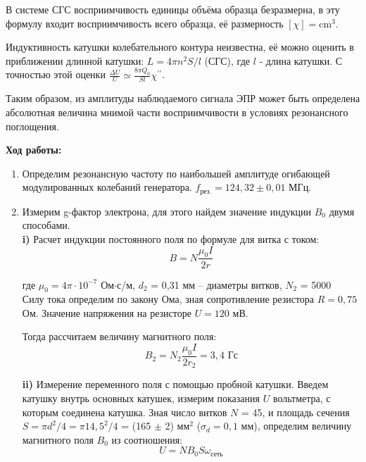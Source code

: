 \documentclass[a4paper, 12pt]{article}%
\begin{document}
	В системе СГС восприимчивость единицы объёма образца безразмерна, в эту формулу входит восприимчивость всего образца, её размерность $[\chi]=\mathrm{cm}^3$.
	
	Индуктивность катушки колебательного контура неизвестна, её можно оценить в приближении длинной катушки: $L=4 \pi n^2 S / l$ (СГС), где $l$ - длина катушки. С точностью этой оценки $\frac{\Delta U}{U} \simeq \frac{8 \pi Q_0}{S l} \chi^{\prime \prime}$.
	
	Таким образом, из амплитуды наблюдаемого сигнала ЭПР может быть определена абсолютная величина мнимой части восприимчивости в условиях резонансного поглощения.
	
	\newpage 
	
	\textbf{Ход работы: }\\
	
	\begin{enumerate}
		
		\item Определим резонансную частоту по наибольшей амплитуде огибающей модулированных колебаний генератора. $f_{\text{рез.}} = 124,32 \pm 0,01$ МГц.
		
		\item Измерим g-фактор электрона, для этого найдем значение индукции $B_0$ двумя способами. \\
		
		\textbf{i)} Расчет индукции постоянного поля по формуле для витка с током: 
		$$B= N\frac{\mu_0 I}{2r} $$
		
		где $\mu_0 = 4\pi \cdot 10^{-7}$ Ом$\cdot$с/м, $d_2$ = 0,31 мм -- диаметры витков,  $N_2$ = 5000\\
		Силу тока определим по закону Ома, зная сопротивление резистора $R = 0,75$ Ом. Значение напряжения на резисторе $U = 120$ мВ.
		
		Тогда рассчитаем величину магнитного поля:
		$$ B_2 = N_2\frac{\mu_0 I}{2r_2} = 3,4 \text{ Гс}$$
				
		\textbf{ii)} Измерение переменного поля с помощью пробной катушки. Введем катушку внутрь основных катушек, измерим показания $U$ вольтметра, с которым соединена катушка. Зная число витков $N$ = 45, и площадь сечения $S = \pi d^2/4 = \pi 14,5^2 / 4 $ = (165 $\pm$ 2) мм$^2$ ($\sigma_d = 0,1$ мм), определим величину магнитного поля $B_0$ из соотношения:
		$$ U = NB_0S\omega_{\text{сеть}} $$
		

\end{enumerate}
\end{document}

